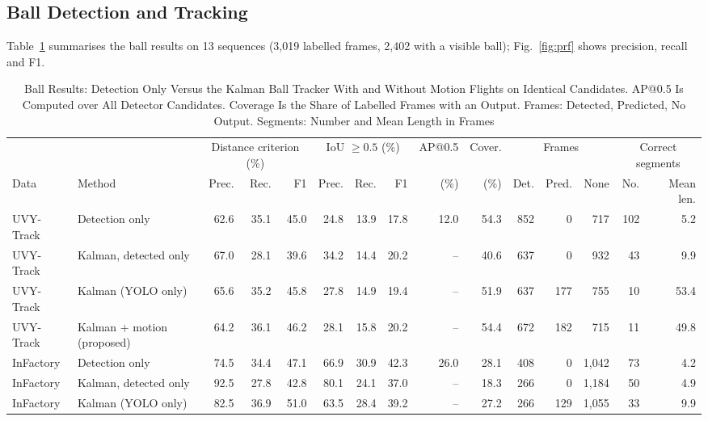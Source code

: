 \documentclass[conference]{IEEEtran}
\begin{document}
\subsection{Ball Detection and Tracking}
\label{sec:ballresults}
Table~\ref{tab:ball} summarises the ball results on 13 sequences (3,019 labelled
frames, 2,402 with a visible ball); Fig.~\ref{fig:prf} shows precision, recall
and F1.

\begin{table}[t]
\caption{Ball Results: Detection Only Versus the Kalman Ball Tracker With and
Without Motion Flights on Identical Candidates. AP@0.5 Is Computed over All Detector Candidates. Coverage Is the
Share of Labelled Frames with an Output. Frames: Detected, Predicted, No Output. Segments: Number and Mean Length in Frames}
\label{tab:ball}
\centering
\footnotesize
\setlength{\tabcolsep}{3.5pt}
\begin{adjustbox}{max width=\textwidth}
\begin{tabular}{@{}llrrrrrrrrrrrrr@{}}
\toprule
 & & \multicolumn{3}{c}{Distance criterion (\%)} & \multicolumn{3}{c}{IoU $\geq 0.5$ (\%)} & AP@0.5 & Cover. & \multicolumn{3}{c}{Frames} & \multicolumn{2}{c}{Correct segments} \\
\cmidrule(lr){3-5}\cmidrule(lr){6-8}\cmidrule(lr){11-13}\cmidrule(lr){14-15}
Data & Method & Prec. & Rec. & F1 & Prec. & Rec. & F1 & (\%) & (\%) & Det. & Pred. & None & No. & Mean len. \\
\midrule
UVY-Track & Detection only & 62.6 & 35.1 & 45.0 & 24.8 & 13.9 & 17.8 & 12.0 & 54.3 & 852 & 0 & 717 & 102 & 5.2 \\
UVY-Track & Kalman, detected only & 67.0 & 28.1 & 39.6 & 34.2 & 14.4 & 20.2 & -- & 40.6 & 637 & 0 & 932 & 43 & 9.9 \\
UVY-Track & Kalman (YOLO only) & 65.6 & 35.2 & 45.8 & 27.8 & 14.9 & 19.4 & -- & 51.9 & 637 & 177 & 755 & 10 & 53.4 \\
UVY-Track & Kalman + motion (proposed) & 64.2 & 36.1 & 46.2 & 28.1 & 15.8 & 20.2 & -- & 54.4 & 672 & 182 & 715 & 11 & 49.8 \\
\midrule
InFactory & Detection only & 74.5 & 34.4 & 47.1 & 66.9 & 30.9 & 42.3 & 26.0 & 28.1 & 408 & 0 & 1{,}042 & 73 & 4.2 \\
InFactory & Kalman, detected only & 92.5 & 27.8 & 42.8 & 80.1 & 24.1 & 37.0 & -- & 18.3 & 266 & 0 & 1{,}184 & 50 & 4.9 \\
InFactory & Kalman (YOLO only) & 82.5 & 36.9 & 51.0 & 63.5 & 28.4 & 39.2 & -- & 27.2 & 266 & 129 & 1{,}055 & 33 & 9.9 \\

\end{tabular}
\end{adjustbox}
\end{table}
\end{document}
